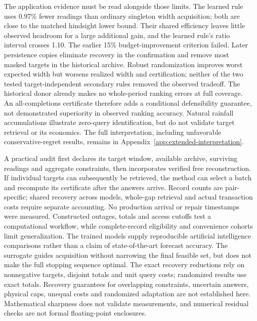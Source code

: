 \documentclass[12pt]{article}
\begin{document}
The application evidence must be read alongside those limits. The
learned rule uses 0.97\% fewer readings than ordinary singleton width
acquisition; both are close to the matched hindsight lower bound. Their
shared efficiency leaves little observed headroom for a large additional
gain, and the learned rule's ratio interval crosses 1.10. The earlier
15\% budget-improvement criterion failed. Later persistence copies
eliminate recovery in the confirmation and remove most masked targets
in the historical archive. Robust randomization improves worst expected
width but worsens realized width and certification; neither of the two
tested target-independent secondary rules removed the observed tradeoff.
The historical donor
already makes no whole-period ranking errors at full coverage. An
all-completions certificate therefore adds a conditional defensibility
guarantee, not demonstrated superiority in observed ranking accuracy.
Natural rainfall accumulations illustrate zero-query identification,
but do not validate target retrieval or its economics. The full
interpretation, including unfavorable conservative-regret results,
remains in Appendix~\ref{app:extended-interpretation}.

A practical audit first declares its target window, available archive,
surviving readings and aggregate constraints, then incorporates verified
free reconstruction. If individual targets can subsequently be retrieved,
the method can select a batch and recompute its certificate after the
answers arrive. Record counts are pair-specific; shared recovery across
models, whole-gap retrieval and actual transaction costs require separate
accounting. No production arrival or repair timestamps were measured.
Constructed outages, totals and access cutoffs test a computational
workflow, while complete-record eligibility and convenience cohorts
limit generalization. The trained models supply reproducible artificial
intelligence comparisons rather than a claim of state-of-the-art
forecast accuracy. The surrogate guides acquisition without narrowing
the final feasible set, but does not make the full stopping sequence
optimal. The exact recovery reductions rely on nonnegative targets,
disjoint totals and unit query costs; randomized results use exact totals.
Recovery guarantees for overlapping constraints, uncertain answers,
physical caps, unequal costs and randomized adaptation are not established
here. Mathematical sharpness does not validate measurements,
and numerical residual checks are not formal floating-point enclosures.
\end{document}
